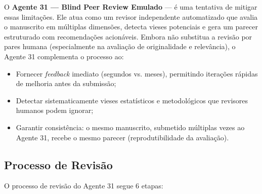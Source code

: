 O \textbf{Agente 31 — Blind Peer Review Emulado} — é uma tentativa
de mitigar essas limitações. Ele atua como um revisor independente
automatizado que avalia o manuscrito em múltiplas dimensões,
detecta vieses potenciais e gera um parecer estruturado com
recomendações acionáveis. Embora não substitua a revisão por pares
humana (especialmente na avaliação de originalidade e relevância),
o Agente 31 complementa o processo ao:

\begin{itemize}
    \item Fornecer \textit{feedback} imediato (segundos vs.
    meses), permitindo iterações rápidas de melhoria antes da
    submissão;

    \item Detectar sistematicamente vieses estatísticos e
    metodológicos que revisores humanos podem ignorar;

    \item Garantir consistência: o mesmo manuscrito, submetido
    múltiplas vezes ao Agente 31, recebe o mesmo parecer
    (reprodutibilidade da avaliação).
\end{itemize}

\subsection{Processo de Revisão}
\label{sec:processo_revisao}

O processo de revisão do Agente 31 segue 6 etapas:

